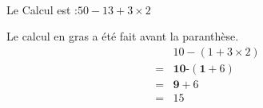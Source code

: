 \begin{multicols}{2}
    \\    
    Le Calcul est :$50-13+3\times 2$
    
    \columnbreak
    
    Le calcul en gras a été fait avant la paranthèse.
    \begin{align*}
        &10-(1+3\times 2)\\
        =&\textbf{10-}(\textbf{1}+6)\\
        =&\textbf{9}+6\\
        =&15
    \end{align*}
\end{multicols}